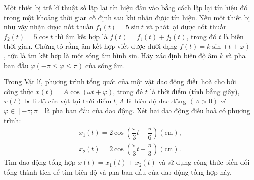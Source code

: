 \begin{vd}
	Một thiết bị trễ kĩ thuật số lặp lại tín hiệu đầu vào bằng cách lặp lại tín hiệu đó trong một khoảng thời gian cố định sau khi nhận được tín hiệu. Nếu một thiết bị như vậy nhận được nốt thuần $f_1(t)=5 \sin t$ và phát lại được nốt thuần $f_2(t)=5 \cos t$ thì âm kết hợp là $f(t)=f_1(t)+f_2(t)$, trong đó $t$ là biến thời gian. Chứng tỏ rằng âm kết hợp viết được dưới dạng $f(t)=k \sin (t+\varphi)$, tức là âm kết hợp là một sóng âm hình sin. Hãy xác định biên độ âm $k$ và pha ban đầu $\varphi(-\pi \leq \varphi \leq \pi)$ của sóng âm.
\end{vd} 

\begin{vd}
	Trong Vật lí, phương trình tổng quát của một vật dao động điều hoà cho bởi công thức $x(t)=A \cos (\omega t+\varphi)$, trong đó $t$ là thời điểm (tính bằng giây), $x(t)$ là li độ của vật tại thời điểm $t, A$ là biên độ dao động $(A>0)$ và $\varphi \in[-\pi ; \pi]$ là pha ban đầu của dao động. Xét hai dao động điều hoà có phương trình:
	$$
	\begin{aligned}
		& x_1(t)=2 \cos \left(\dfrac{\pi}{3} t+\dfrac{\pi}{6}\right)(\mathrm{cm}), \\
		& x_2(t)=2 \cos \left(\dfrac{\pi}{3} t-\dfrac{\pi}{3}\right)(\mathrm{cm}) .
	\end{aligned}
	$$
	Tìm dao động tổng hợp $x(t)=x_1(t)+x_2(t)$ và sử dụng công thức biến đổi tổng thành tích để tìm biên độ và pha ban đầu của dao động tồng hợp này.
\end{vd} 

